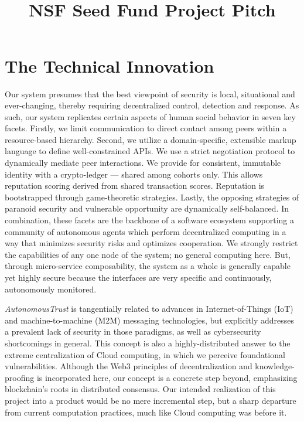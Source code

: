 \documentclass[10pt]{article}
\title{\textbf{\huge \projectName}\\ NSF Seed Fund Project Pitch %
\vspace{-2em}%
}
\date{\monthname{} \the\year}
\newcommand{\projectName}{\emph{AutonomousTrust }}
\begin{document}
	
\TekFiveTitle[0in]

\section{The Technical Innovation}\label{sec:innovation}



Our system presumes that the best viewpoint of security is local, situational and ever-changing, thereby requiring decentralized control, detection and response.
As such, our system replicates certain aspects of human social behavior in seven key facets.
Firstly, we limit communication to direct  contact among peers within a resource-based hierarchy.
Second, we utilize a domain-specific, extensible markup language to define well-constrained APIs.
We use a strict negotiation protocol to dynamically mediate peer interactions.
We provide for consistent, immutable identity with a crypto-ledger --- shared among cohorts only.
This allows reputation scoring derived from shared transaction scores.
Reputation is bootstrapped through game-theoretic strategies.
Lastly, the opposing strategies of paranoid security and vulnerable opportunity are dynamically self-balanced.
In combination, these facets are the backbone of a software ecosystem supporting a community of autonomous agents which perform decentralized computing in a way that minimizes security risks and optimizes cooperation.
We strongly restrict the capabilities of any one node of the system; no general computing here.
But, through micro-service composability, the system as a whole is generally capable yet highly secure because the interfaces are very specific and continuously, autonomously monitored.

\projectName is tangentially related to advances in Internet-of-Things (IoT) and machine-to-machine (M2M) messaging technologies, but explicitly addresses a prevalent lack of security in those paradigms, as well as cybersecurity shortcomings in general.
This concept is also a highly-distributed answer to the extreme centralization of Cloud computing, in which we perceive foundational vulnerabilities.
Although the Web3 principles of decentralization and knowledge-proofing is incorporated here, our concept is a concrete step beyond, emphasizing blockchain's roots in distributed consensus.
Our intended realization of this project into a product would be no mere incremental step, but a sharp departure from current computation practices, much like Cloud computing was before it.
\end{document}
